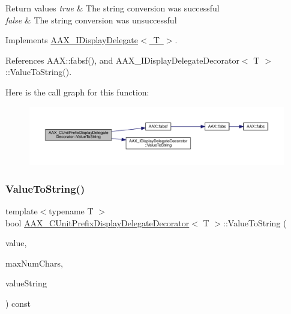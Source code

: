 \begin{DoxyRetVals}{Return values}
{\em true} & The string conversion was successful \\
\hline
{\em false} & The string conversion was unsuccessful \\
\hline
\end{DoxyRetVals}


Implements \mbox{\hyperlink{a01801_a7fd1e2f55055c817937bbfa66b73b2fd}{A\+A\+X\+\_\+\+I\+Display\+Delegate$<$ T $>$}}.



References A\+A\+X\+::fabsf(), and A\+A\+X\+\_\+\+I\+Display\+Delegate\+Decorator$<$ T $>$\+::\+Value\+To\+String().

Here is the call graph for this function\+:
\nopagebreak
\begin{figure}[H]
\begin{center}
\leavevmode
\includegraphics[width=350pt]{a01589_a74d63ddd342455674e9b1b00dc0f76e2_cgraph}
\end{center}
\end{figure}
\mbox{\label{a01589_a0dc5128bed27ac1d671df4e4ac04d806}} 
\subsubsection{\texorpdfstring{ValueToString()}{ValueToString()}\hspace{0.1cm}{\footnotesize\ttfamily [2/2]}}
{\footnotesize\ttfamily template$<$typename T $>$ \\
bool \mbox{\hyperlink{a01589}{A\+A\+X\+\_\+\+C\+Unit\+Prefix\+Display\+Delegate\+Decorator}}$<$ T $>$\+::Value\+To\+String (\begin{DoxyParamCaption}\item[{T}]{value,  }\item[{int32\+\_\+t}]{max\+Num\+Chars,  }\item[{\mbox{\hyperlink{a01573}{A\+A\+X\+\_\+\+C\+String}} $\ast$}]{value\+String }\end{DoxyParamCaption}) const\hspace{0.3cm}{\ttfamily [virtual]}}



